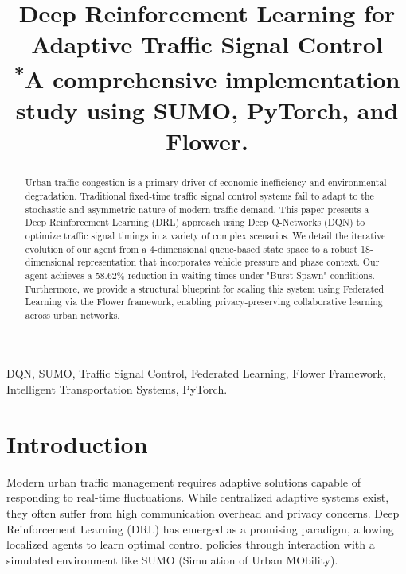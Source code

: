 \documentclass[conference]{IEEEtran}
\begin{document}
\title{Deep Reinforcement Learning for Adaptive Traffic Signal Control\\
{\footnotesize \textsuperscript{*}A comprehensive implementation study using SUMO, PyTorch, and Flower.}
}

\author{
\and
{}
\and
{}
}

\maketitle

\begin{abstract}
Urban traffic congestion is a primary driver of economic inefficiency and environmental degradation. Traditional fixed-time traffic signal control systems fail to adapt to the stochastic and asymmetric nature of modern traffic demand. This paper presents a Deep Reinforcement Learning (DRL) approach using Deep Q-Networks (DQN) to optimize traffic signal timings in a variety of complex scenarios. We detail the iterative evolution of our agent from a 4-dimensional queue-based state space to a robust 18-dimensional representation that incorporates vehicle pressure and phase context. Our agent achieves a 58.62\% reduction in waiting times under "Burst Spawn" conditions. Furthermore, we provide a structural blueprint for scaling this system using Federated Learning via the Flower framework, enabling privacy-preserving collaborative learning across urban networks.
\end{abstract}

\begin{IEEEkeywords}
DQN, SUMO, Traffic Signal Control, Federated Learning, Flower Framework, Intelligent Transportation Systems, PyTorch.
\end{IEEEkeywords}

\section{Introduction}
Modern urban traffic management requires adaptive solutions capable of responding to real-time fluctuations. While centralized adaptive systems exist, they often suffer from high communication overhead and privacy concerns. Deep Reinforcement Learning (DRL) has emerged as a promising paradigm, allowing localized agents to learn optimal control policies through interaction with a simulated environment like SUMO (Simulation of Urban MObility).
\end{document}
